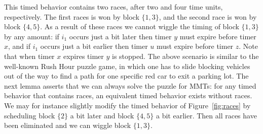\fi
This timed behavior contains two races, after two and four time units, respectively.
The first races is won by block $\{ 1, 3 \}$, and the second race is won by block $\{ 4, 5 \}$.
As a result of these races we cannot wiggle the timing of block $\{ 1, 3 \}$ by any amount:
if $i_1$ occurs just a bit later then timer $y$ must expire before timer $x$,
and if $i_1$ occurs just a bit earlier then timer $u$ must expire before timer $z$.
Note that when timer $x$ expires timer $y$ is stopped.
%
The above scenario is similar to the well-known Rush Hour puzzle game,
in which one has to slide blocking vehicles out of the way to find a path for one specific red car to exit a parking lot.
The next lemma asserts that we can always solve the puzzle for MMTs: for any timed behavior that contains races,
an equivalent timed behavior exists without races.
We may for instance slightly modify the timed behavior
\iflong
of Figure~\ref{fig:races} 
\fi
by scheduling block $\{ 2  \}$
a bit later and block $\{ 4, 5 \}$ a bit earlier.
Then all races have been eliminated and we can wiggle block $\{ 1, 3 \}$.


